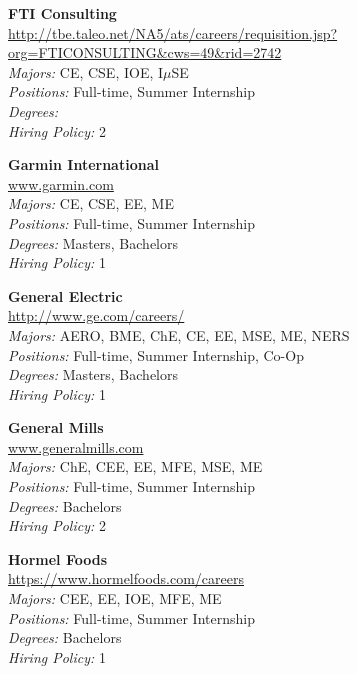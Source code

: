 \documentclass[twoside]{article}
\begin{document}
\begin{center}
\begin{multicols}{3}
\begin{minipage}{.9\columnwidth}{\Large\bf FTI Consulting }\\
	\url{http://tbe.taleo.net/NA5/ats/careers/requisition.jsp?org=FTICONSULTING&cws=49&rid=2742}\\
	\emph{Majors:} CE, CSE, IOE, I$\mu$SE\\
	\emph{Positions:} Full-time, Summer Internship\\
	\emph{Degrees:} \\
	\emph{Hiring Policy:} 2\\
\end{minipage}
 
\begin{minipage}{.9\columnwidth}{\Large\bf Garmin International }\\
	\url{www.garmin.com}\\
	\emph{Majors:} CE, CSE, EE, ME\\
	\emph{Positions:} Full-time, Summer Internship\\
	\emph{Degrees:} Masters, Bachelors\\
	\emph{Hiring Policy:} 1\\
\end{minipage}
 
\begin{minipage}{.9\columnwidth}{\Large\bf General Electric }\\
	\url{http://www.ge.com/careers/}\\
	\emph{Majors:} AERO, BME, ChE, CE, EE, MSE, ME, NERS\\
	\emph{Positions:} Full-time, Summer Internship, Co-Op\\
	\emph{Degrees:} Masters, Bachelors\\
	\emph{Hiring Policy:} 1\\
\end{minipage}
 
\begin{minipage}{.9\columnwidth}{\Large\bf General Mills }\\
	\url{www.generalmills.com}\\
	\emph{Majors:} ChE, CEE, EE, MFE, MSE, ME\\
	\emph{Positions:} Full-time, Summer Internship\\
	\emph{Degrees:} Bachelors\\
	\emph{Hiring Policy:} 2\\
\end{minipage}
 
\begin{minipage}{.9\columnwidth}{\Large\bf Hormel Foods }\\
	\url{https://www.hormelfoods.com/careers}\\
	\emph{Majors:} CEE, EE, IOE, MFE, ME\\
	\emph{Positions:} Full-time, Summer Internship\\
	\emph{Degrees:} Bachelors\\
	\emph{Hiring Policy:} 1\\
\end{minipage}
 

\end{multicols}
\end{center}
\end{document}

